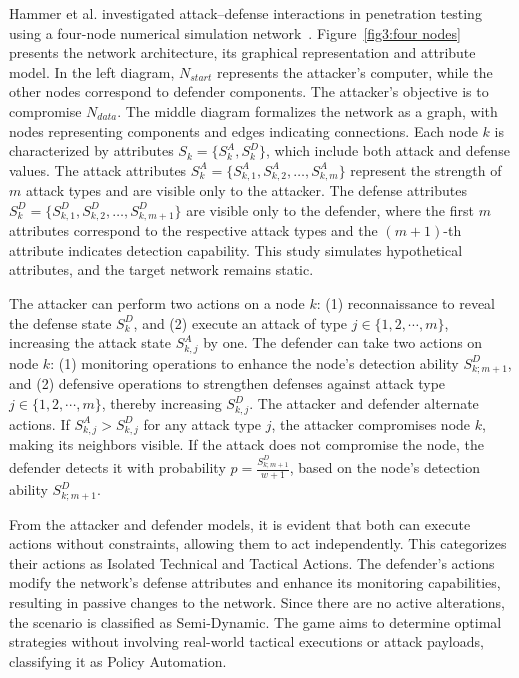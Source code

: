 Hammer et al. investigated attack–defense interactions in penetration testing using a four-node numerical simulation network~\cite{2020Finding}. Figure~\ref{fig3:four nodes} presents the network architecture, its graphical representation and attribute model.
In the left diagram, $N_{start}$ represents the attacker's computer, while the other nodes correspond to defender components. The attacker’s objective is to compromise $N_{data}$. The middle diagram formalizes the network as a graph, with nodes representing components and edges indicating connections. 
Each node $k$ is characterized by attributes $S_k = \{S^A_k, S^D_k\}$, which include both attack and defense values. The attack attributes $S^A_k = \{S^A_{k,1}, S^A_{k,2}, \ldots, S^A_{k,m}\}$ represent the strength of $m$ attack types and are visible only to the attacker. The defense attributes $S^D_k = \{S^D_{k,1}, S^D_{k,2}, \ldots, S^D_{k,m+1}\}$ are visible only to the defender, where the first $m$ attributes correspond to the respective attack types and the $(m+1)$-th attribute indicates detection capability. This study simulates hypothetical attributes, and the target network remains static.

The attacker can perform two actions on a node $k$: (1) reconnaissance to reveal the defense state $S^D_k$, and (2) execute an attack of type $j \in \{1,2,\cdots, m\}$, increasing the attack state $S^A_{k,j}$ by one. The defender can take two actions on node $k$: (1) monitoring operations to enhance the node's detection ability $S^D_{k;m+1}$, and (2) defensive operations to strengthen defenses against attack type $j \in \{1,2,\cdots, m\}$, thereby increasing $S^D_{k,j}$. The attacker and defender alternate actions. If $S^A_{k,j} > S^D_{k,j}$ for any attack type $j$, the attacker compromises node $k$, making its neighbors visible. If the attack does not compromise the node, the defender detects it with probability $p = \frac{S^D_{k;m+1}}{w+1}$, based on the node's detection ability $S^D_{k;m+1}$.

From the attacker and defender models, it is evident that both can execute actions without constraints, allowing them to act independently. This categorizes their actions as Isolated Technical and Tactical Actions. The defender’s actions modify the network’s defense attributes and enhance its monitoring capabilities, resulting in passive changes to the network. Since there are no active alterations, the scenario is classified as Semi-Dynamic. The game aims to determine optimal strategies without involving real-world tactical executions or attack payloads, classifying it as Policy Automation.

